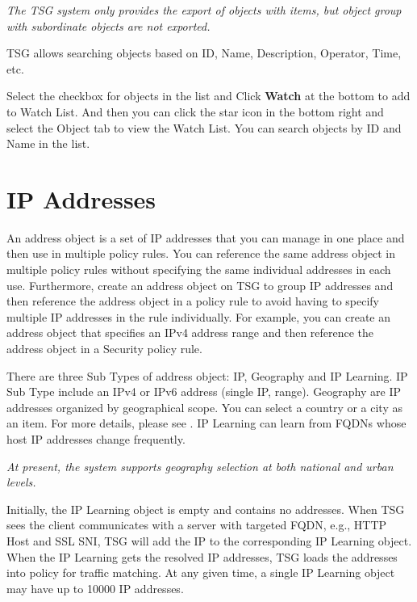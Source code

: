\notemark\textit{The TSG system only provides the export of objects with items, but object group with subordinate objects are not exported.}


TSG allows searching objects based on ID, Name, Description, Operator, Time, etc.


Select the checkbox for objects in the list and Click \textbf{Watch} at the bottom to add to Watch List. And then you can click the star icon in the bottom right and 
select the Object tab to view the Watch List. You can search objects by ID and Name in the list.

\section*{\hypertarget{link:IP Addresses}{IP Addresses}}
\label{sec:objects:ip}

An address object is a set of IP addresses that you can manage in one place and then use in multiple policy rules. You can reference the same address object in multiple policy rules without 
specifying the same individual addresses in each use. Furthermore, create an address object on TSG to group IP addresses and then reference the address object in a policy rule to 
avoid having to specify multiple IP addresses in the rule individually. For example, you can create an address object that specifies an IPv4 address range 
and then reference the address object in a Security policy rule. 


There are three Sub Types of address object: IP, Geography and IP Learning. IP Sub Type include an IPv4 or IPv6 address (single IP, range). Geography are IP addresses organized by geographical scope. 
You can select a country or a city as an item. For more details, please see \textbf{\hyperlink{link:IP Libraries}{\color{linkblue}{IP Libraries}}}. 
IP Learning can learn from FQDNs whose host IP addresses change frequently.


\notemark\textit{At present, the system supports geography selection at both national and urban levels.}


Initially, the IP Learning object is empty and contains no addresses. When TSG sees the client communicates with a server with targeted FQDN, e.g., HTTP Host and SSL SNI, 
TSG will add the IP to the corresponding IP Learning object. When the IP Learning gets the resolved IP addresses, TSG loads the addresses into policy for traffic matching. 
At any given time, a single IP Learning object may have up to 10000 IP addresses.


